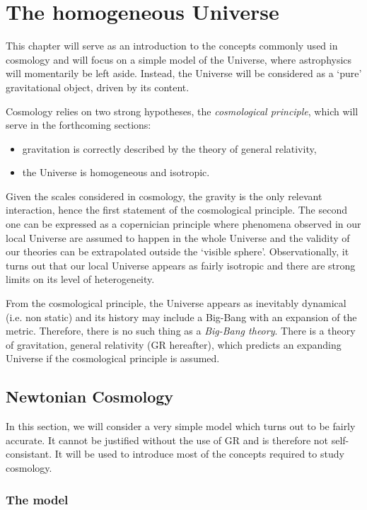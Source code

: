 \chapter{The homogeneous Universe} %
\label{cha:the_homogeneous_universe}
This chapter will serve as an introduction to the concepts commonly used in cosmology and will focus on a simple model of the Universe, where astrophysics will momentarily be left aside. Instead, the Universe will be considered as a `pure' gravitational object, driven by its content. 

Cosmology relies on two strong hypotheses, the \emph{cosmological principle}, which will serve in the forthcoming sections:
\begin{itemize}
	\item gravitation is correctly described by the theory of general relativity,
	\item the Universe is homogeneous and isotropic.
\end{itemize}
Given the scales considered in cosmology, the gravity is the only relevant interaction, hence the first statement of the cosmological principle. The second one can be expressed as a copernician principle where phenomena observed in our local Universe are assumed to happen in the whole Universe and the validity of our theories can be extrapolated outside the `visible sphere'. Observationally, it turns out that our local Universe appears as fairly isotropic and there are strong limits on its level of heterogeneity.

From the cosmological principle, the Universe appears as inevitably dynamical (i.e. non static) and its history may include a Big-Bang with an expansion of the metric. Therefore, there is no such thing as a \emph{Big-Bang theory}. There is a theory of gravitation, general relativity (GR hereafter), which predicts an expanding Universe if the cosmological principle is assumed. 

\section{Newtonian Cosmology} %
\label{sec:newtonian_cosmology}
In this section, we will consider a very simple model which turns out to be fairly accurate. It cannot be justified without the use of GR and is therefore not self-consistant. It will be used to introduce most of the concepts required to study cosmology.

\subsection{The model} %
\label{sub:the_model}

